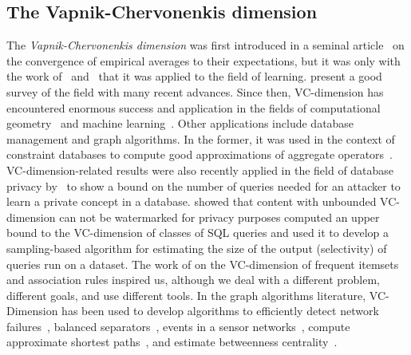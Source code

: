 \subsection{The Vapnik-Chervonenkis dimension}\label{sec:prevworkvc}
The {\em Vapnik-Chervonenkis dimension} was first introduced in a seminal
article~\citep{VapnikC71} on the convergence of empirical averages to their
expectations, but it was only with the work of~\citet{HausslerW86}
and~\citet{BlumerEHW89} that it was applied to the field of learning.
\citet{BoucheronBL05} present a good survey of the field with many recent
advances. Since then, VC-dimension has encountered enormous success and
application in the fields of computational
geometry~\citep{Chazelle00,Matousek02} and machine
learning~\citep{AnthonyB99,DevroyeGL96}. Other applications include database
management and graph algorithms.  In the former, it was used in the context of
constraint databases to compute good approximations of aggregate
operators~\citep{BenediktL02}. VC-dimension-related results were also recently
applied in the field of database privacy by~\citet{BlumLR08} to show a bound on
the number of queries needed for an attacker to learn a private concept in a
database. \citet{Gross11} showed that content with unbounded VC-dimension can
not be watermarked for privacy purposes  \citet{RiondatoACZU11} computed an
upper bound to the VC-dimension of classes of SQL queries and used it to develop
a sampling-based algorithm for estimating the size of the output (selectivity)
of queries run on a dataset. The work of \citet{RiondatoU14} on the
VC-dimension of frequent itemsets and association rules inspired us, although we
deal with a different problem, different goals, and use different tools. In the
graph algorithms literature, VC-Dimension has been used to develop algorithms to
efficiently detect network failures~\citep{Kleinberg03,KleinbergSS08}, balanced
separators~\citep{FeigeM06}, events in a sensor networks~\citep{GandhiSW10},
compute approximate shortest paths~\citep{AbrahamDFGW11}, and estimate
betweenness centrality~\citep{RiondatoK14}.
